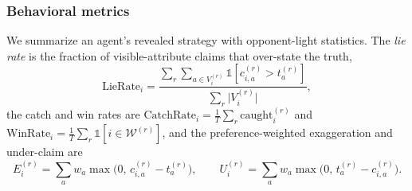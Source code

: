 \subsubsection{Behavioral metrics}
\label{sec:dec-metrics}
We summarize an agent's revealed strategy with opponent-light statistics. The
\emph{lie rate} is the fraction of visible-attribute claims that over-state the
truth,
\begin{equation}
\mathrm{LieRate}_i =
\frac{\sum_r \sum_{a \in V_i^{(r)}} \mathbb{1}\!\left[c_{i,a}^{(r)} > t_a^{(r)}\right]}
     {\sum_r \lvert V_i^{(r)} \rvert},
\label{eq:dec-lierate}
\end{equation}
the catch and win rates are $\mathrm{CatchRate}_i = \tfrac{1}{T}\sum_r \mathrm{caught}_i^{(r)}$
and $\mathrm{WinRate}_i = \tfrac{1}{T}\sum_r \mathbb{1}[i \in \mathcal{W}^{(r)}]$,
and the preference-weighted exaggeration and under-claim are
\begin{equation}
E_i^{(r)} = \sum_{a} w_a \max\!\bigl(0,\, c_{i,a}^{(r)} - t_a^{(r)}\bigr),
\qquad
U_i^{(r)} = \sum_{a} w_a \max\!\bigl(0,\, t_a^{(r)} - c_{i,a}^{(r)}\bigr).
\label{eq:dec-exag}
\end{equation}

